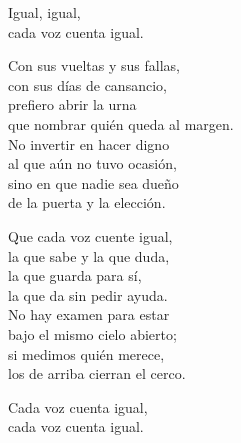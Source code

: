 \begin{lyrics}
Igual, igual,\\
cada voz cuenta igual.

Con sus vueltas y sus fallas,\\
con sus días de cansancio,\\
prefiero abrir la urna\\
que nombrar quién queda al margen.\\
No invertir en hacer digno\\
al que aún no tuvo ocasión,\\
sino en que nadie sea dueño\\
de la puerta y la elección.

Que cada voz cuente igual,\\
la que sabe y la que duda,\\
la que guarda para sí,\\
la que da sin pedir ayuda.\\
No hay examen para estar\\
bajo el mismo cielo abierto;\\
si medimos quién merece,\\
los de arriba cierran el cerco.

Cada voz cuenta igual,\\
cada voz cuenta igual.
\end{lyrics}

